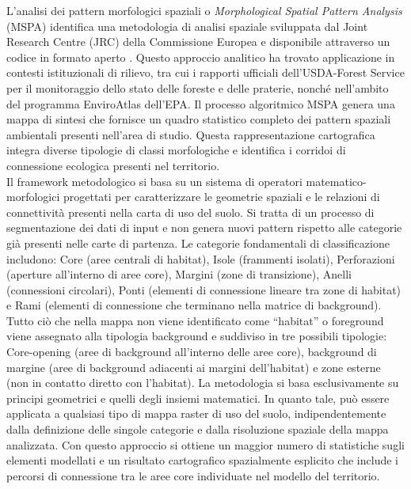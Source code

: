 \documentclass[
]{book}
\begin{document}
L'analisi dei pattern morfologici spaziali o \emph{Morphological Spatial Pattern Analysis} (MSPA) identifica una metodologia di analisi spaziale sviluppata dal Joint Research Centre (JRC) della Commissione Europea e disponibile attraverso un codice in formato aperto \citep{vogtGuidosToolboxUniversalDigital2017, vogtAbbreviationLarvalDevelopment2013, vogtMeasuringForestSpatial2025}.
Questo approccio analitico ha trovato applicazione in contesti istituzionali di rilievo, tra cui i rapporti ufficiali dell'USDA-Forest Service per il monitoraggio dello stato delle foreste e delle praterie, nonché nell'ambito del programma EnviroAtlas dell'EPA. Il processo algoritmico MSPA genera una mappa di sintesi che fornisce un quadro statistico completo dei pattern spaziali ambientali presenti nell'area di studio.
Questa rappresentazione cartografica integra diverse tipologie di classi morfologiche e identifica i corridoi di connessione ecologica presenti nel territorio.\\
Il framework metodologico si basa su un sistema di operatori matematico-morfologici progettati per caratterizzare le geometrie spaziali e le relazioni di connettività presenti nella carta di uso del suolo.
Si tratta di un processo di segmentazione dei dati di input e non genera nuovi pattern rispetto alle categorie già presenti nelle carte di partenza.
Le categorie fondamentali di classificazione includono: Core (aree centrali di habitat), Isole (frammenti isolati), Perforazioni (aperture all'interno di aree core), Margini (zone di transizione), Anelli (connessioni circolari), Ponti (elementi di connessione lineare tra zone di habitat) e Rami (elementi di connessione che terminano nella matrice di background).
Tutto ciò che nella mappa non viene identificato come ``habitat'' o foreground viene assegnato alla tipologia background e suddiviso in tre possibili tipologie: Core-opening (aree di background all'interno delle aree core), background di margine (aree di background adiacenti ai margini dell'habitat) e zone esterne (non in contatto diretto con l'habitat).
La metodologia si basa esclusivamente su principi geometrici e quelli degli insiemi matematici.
In quanto tale, può essere applicata a qualsiasi tipo di mappa raster di uso del suolo, indipendentemente dalla definizione delle singole categorie e dalla risoluzione spaziale della mappa analizzata.
Con questo approccio si ottiene un maggior numero di statistiche sugli elementi modellati e un risultato cartografico spazialmente esplicito che include i percorsi di connessione tra le aree core individuate nel modello del territorio.
\end{document}
